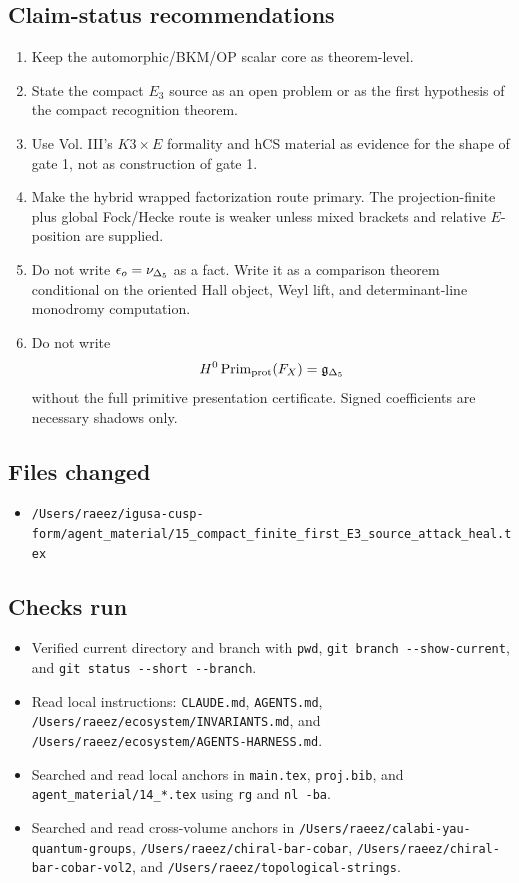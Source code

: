 \subsection{Claim-status recommendations}

\begin{enumerate}
\item Keep the automorphic/BKM/OP scalar core as theorem-level.
\item State the compact \(E_3\) source as an open problem or as the first
hypothesis of the compact recognition theorem.
\item Use Vol. III's \(K3\times E\) formality and hCS material as
evidence for the shape of gate 1, not as construction of gate 1.
\item Make the hybrid wrapped factorization route primary.  The
projection-finite plus global Fock/Hecke route is weaker unless mixed
brackets and relative \(E\)-position are supplied.
\item Do not write \(\epsilon_o=\nu_{\Delta_5}\) as a fact.  Write it as a
comparison theorem conditional on the oriented Hall object, Weyl lift, and
determinant-line monodromy computation.
\item Do not write
\[
        H^0\operatorname{Prim}_{\operatorname{prot}}(F_X)=\mathfrak g_{\Delta_5}
\]
without the full primitive presentation certificate.  Signed coefficients
are necessary shadows only.
\end{enumerate}

\subsection{Files changed}

\begin{itemize}
\item \verb|/Users/raeez/igusa-cusp-form/agent_material/15_compact_finite_first_E3_source_attack_heal.tex|
\end{itemize}

\subsection{Checks run}

\begin{itemize}
\item Verified current directory and branch with
\verb|pwd|, \verb|git branch --show-current|, and
\verb|git status --short --branch|.
\item Read local instructions:
\verb|CLAUDE.md|, \verb|AGENTS.md|,
\verb|/Users/raeez/ecosystem/INVARIANTS.md|, and
\verb|/Users/raeez/ecosystem/AGENTS-HARNESS.md|.
\item Searched and read local anchors in \verb|main.tex|, \verb|proj.bib|,
and \verb|agent_material/14_*.tex| using \verb|rg| and \verb|nl -ba|.
\item Searched and read cross-volume anchors in
\verb|/Users/raeez/calabi-yau-quantum-groups|,
\verb|/Users/raeez/chiral-bar-cobar|,
\verb|/Users/raeez/chiral-bar-cobar-vol2|, and
\verb|/Users/raeez/topological-strings|.
\end{itemize}

